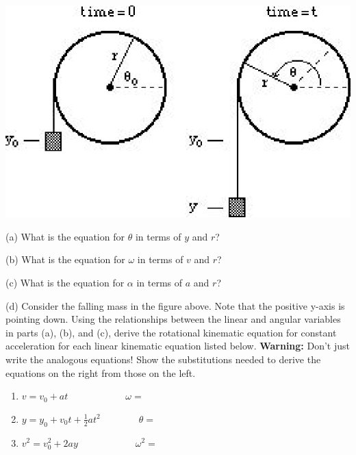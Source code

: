 \vspace{0.3cm}
{\par\centering \includegraphics{rotation_fig9.eps} \par}
\vspace{0.3cm}

(a) What is the equation for \( \theta  \) in terms of $y$ and $r$?
\vspace{10mm}

(b) What is the equation for \( \omega  \) in terms of $v$ and $r$?
\vspace{10mm}

(c) What is the equation for \( \alpha  \) in terms of $a$ and $r$?
\vspace{10mm}

(d) Consider the falling mass in the figure above. Note that the positive 
y-axis is pointing down. Using the 
relationships between the linear and angular variables in parts (a), (b), and 
(c), derive the rotational kinematic equation for constant acceleration for 
each linear kinematic equation listed below. \textbf{Warning:} Don't just write
the analogous equations! Show the substitutions needed to derive the equations
on the right from those on the left.

\begin{enumerate}
\item \( v=v_{0}+at\qquad \qquad \qquad \omega = \)\vspace{20mm}

\item \( y=y_{0}+v_{0}t+\frac{1}{2}at^{2}\qquad \qquad \theta = \)\vspace{20mm}

\item \( v^{2}=v_{0}^{2}+2ay\qquad \qquad \qquad \omega ^{2}= \)
\end{enumerate}
